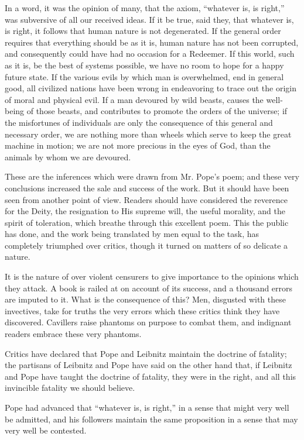 In a word, it was the opinion of many, that the axiom, ``whatever is,
is right,'' was subversive of all our received ideas. If it be true,
said they, that whatever is, is right, it follows that human nature is
not degenerated. If the general order requires that everything should
be as it is, human nature has not been corrupted, and consequently
could have had no occasion for a Redeemer. If this world, such as it
is, be the best of systems possible, we have no room to hope for a
happy future state. If the various evils  by which man is
overwhelmed, end in general good, all civilized nations have been
wrong in endeavoring to trace out the origin of moral and physical
evil. If a man devoured by wild beasts, causes the well-being of those
beasts, and contributes to promote the orders of the universe; if the
misfortunes of individuals are only the consequence of this general
and necessary order, we are nothing more than wheels which serve to
keep the great machine in motion; we are not more precious in the eyes
of God, than the animals by whom we are devoured.

These are the inferences which were drawn from Mr. Pope's poem; and
these very conclusions increased the sale and success of the work. But
it should have been seen from another point of view. Readers should
have considered the reverence for the Deity, the resignation to His
supreme will, the useful morality, and the spirit of toleration, which
breathe through this excellent poem. This the public has done, and the
work being translated by men equal to the task, has completely
triumphed over critics, though it turned on matters of so delicate a
nature.

It is the nature of over violent censurers to give importance to the
opinions which they attack. A book is railed at on account of its
success, and a thousand errors are imputed to it. What is the
consequence of this? Men, disgusted with these invectives, take for
truths the very errors which these critics think they have discovered.
Cavillers raise phantoms on purpose to combat them, and indignant
readers embrace these very phantoms.

Critics have declared that Pope and Leibnitz maintain the doctrine of
fatality; the partisans of Leibnitz and Pope have said on the other
hand that, if Leibnitz and Pope have taught the doctrine of fatality,
they were in the right, and all this invincible fatality we should
believe.

Pope had advanced that ``whatever is, is right,'' in a sense that
might very well be admitted, and his followers maintain the same
proposition in a sense that may very well be contested.

